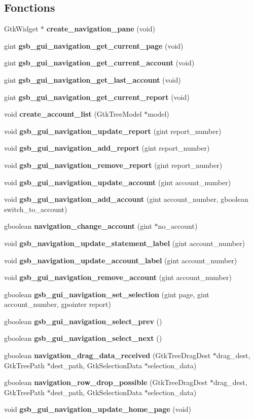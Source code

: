 \subsection*{Fonctions}
\begin{DoxyCompactItemize}
\item 
GtkWidget $\ast$ {\bf create\_\-navigation\_\-pane} (void)
\item 
gint {\bf gsb\_\-gui\_\-navigation\_\-get\_\-current\_\-page} (void)
\item 
gint {\bf gsb\_\-gui\_\-navigation\_\-get\_\-current\_\-account} (void)
\item 
gint {\bf gsb\_\-gui\_\-navigation\_\-get\_\-last\_\-account} (void)
\item 
gint {\bf gsb\_\-gui\_\-navigation\_\-get\_\-current\_\-report} (void)
\item 
void {\bf create\_\-account\_\-list} (GtkTreeModel $\ast$model)
\item 
void {\bf gsb\_\-gui\_\-navigation\_\-update\_\-report} (gint report\_\-number)
\item 
void {\bf gsb\_\-gui\_\-navigation\_\-add\_\-report} (gint report\_\-number)
\item 
void {\bf gsb\_\-gui\_\-navigation\_\-remove\_\-report} (gint report\_\-number)
\item 
void {\bf gsb\_\-gui\_\-navigation\_\-update\_\-account} (gint account\_\-number)
\item 
void {\bf gsb\_\-gui\_\-navigation\_\-add\_\-account} (gint account\_\-number, gboolean switch\_\-to\_\-account)
\item 
gboolean {\bf navigation\_\-change\_\-account} (gint $\ast$no\_\-account)
\item 
void {\bf gsb\_\-navigation\_\-update\_\-statement\_\-label} (gint account\_\-number)
\item 
void {\bf gsb\_\-navigation\_\-update\_\-account\_\-label} (gint account\_\-number)
\item 
void {\bf gsb\_\-gui\_\-navigation\_\-remove\_\-account} (gint account\_\-number)
\item 
gboolean {\bf gsb\_\-gui\_\-navigation\_\-set\_\-selection} (gint page, gint account\_\-number, gpointer report)
\item 
gboolean {\bf gsb\_\-gui\_\-navigation\_\-select\_\-prev} ()
\item 
gboolean {\bf gsb\_\-gui\_\-navigation\_\-select\_\-next} ()
\item 
gboolean {\bf navigation\_\-drag\_\-data\_\-received} (GtkTreeDragDest $\ast$drag\_\-dest, GtkTreePath $\ast$dest\_\-path, GtkSelectionData $\ast$selection\_\-data)
\item 
gboolean {\bf navigation\_\-row\_\-drop\_\-possible} (GtkTreeDragDest $\ast$drag\_\-dest, GtkTreePath $\ast$dest\_\-path, GtkSelectionData $\ast$selection\_\-data)
\item 
void {\bf gsb\_\-gui\_\-navigation\_\-update\_\-home\_\-page} (void)
\end{DoxyCompactItemize}
